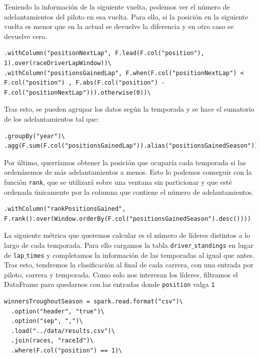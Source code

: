 \documentclass[12pt,twoside,titlepage]{report}
\begin{document}
Teniendo la información de la siguiente vuelta, podemos ver el número de adelantamientos del piloto en esa vuelta. Para ello, si la posición en la siguiente vuelta es menor que en la actual se devuelve la diferencia y en otro caso se devuelve cero.

\begin{lstlisting}
.withColumn("positionNextLap", F.lead(F.col("position"), 1).over(raceDriverLapWindow))\
.withColumn("positionsGainedLap", F.when(F.col("positionNextLap") < F.col("position") , F.abs(F.col("position") - F.col("positionNextLap"))).otherwise(0))\
\end{lstlisting}

Tras esto, se pueden agrupar los datos según la temporada y se hace el sumatorio de los adelantamientos tal que:

\begin{lstlisting}
.groupBy("year")\
.agg(F.sum(F.col("positionsGainedLap")).alias("positionsGainedSeason"))\
\end{lstlisting}

Por último, querríamos obtener la posición que ocuparía cada temporada si las ordenásemos de más adelantamientos a menos. Esto lo podemos conseguir con la función \texttt{rank}, que se utilizará sobre una ventana sin particionar y que esté ordenada únicamente por la columna que contiene el número de adelantamientos.

\begin{lstlisting}
.withColumn("rankPositionsGained", F.rank().over(Window.orderBy(F.col("positionsGainedSeason").desc())))
\end{lstlisting}

La siguiente métrica que queremos calcular es el número de líderes distintos a lo largo de cada temporada. Para ello cargamos la tabla \texttt{driver$\_$standings} en lugar de \texttt{lap$\_$times} y completamos la información de las temporadas al igual que antes. Tras esto, tendremos la clasificación al final de cada carrera, con una entrada por piloto, carrera y temporada. Como solo nos interesan los líderes, filtramos el DataFrame para quedarnos con las entradas donde \texttt{position} valga \texttt{1}

\begin{lstlisting}
winnersTroughoutSeason = spark.read.format("csv")\
  .option("header", "true")\
  .option("sep", ",")\
  .load("../data/results.csv")\
  .join(races, "raceId")\
  .where(F.col("position") == 1)\
\end{lstlisting}
\end{document}
